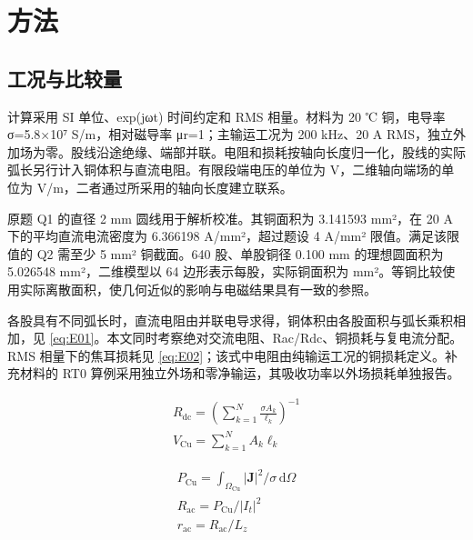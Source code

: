\section{方法}
\label{chapter:02}

\hypertarget{02.conventions.heading}{}
\subsection{工况与比较量}

\hypertarget{02.conventions.p1}{}
计算采用 SI 单位、exp(jωt) 时间约定和 RMS 相量。材料为 20 ℃ 铜，电导率 σ=5.8×10⁷ S/m，相对磁导率 μr=1；主输运工况为 200 kHz、20 A RMS，独立外加场为零。股线沿途绝缘、端部并联。电阻和损耗按轴向长度归一化，股线的实际弧长另行计入铜体积与直流电阻。有限段端电压的单位为 V，二维轴向端场的单位为 V/m，二者通过所采用的轴向长度建立联系。

\hypertarget{02.conventions.p2}{}
原题 Q1 的直径 2 mm 圆线用于解析校准。其铜面积为 3.141593 mm²，在 20 A 下的平均直流电流密度为 6.366198 A/mm²，超过题设 4 A/mm² 限值。满足该限值的 Q2 需至少 5 mm² 铜截面。640 股、单股铜径 0.100 mm 的理想圆面积为 5.026548 mm²，二维模型以 64 边形表示每股，实际铜面积为  mm²。等铜比较使用实际离散面积，使几何近似的影响与电磁结果具有一致的参照。

\hypertarget{02.conventions.p3}{}
各股具有不同弧长时，直流电阻由并联电导求得，铜体积由各股面积与弧长乘积相加，见 \eqref{eq:E01}。本文同时考察绝对交流电阻、Rac/Rdc、铜损耗与复电流分配。RMS 相量下的焦耳损耗见 \eqref{eq:E02}；该式中电阻由纯输运工况的铜损耗定义。补充材料的 RT0 算例采用独立外场和零净输运，其吸收功率以外场损耗单独报告。

\hypertarget{02.equation.E01}{}
\hypertarget{E01}{}
\begin{equation}
\begin{gathered}
R_{\mathrm{dc}}=\left(\sum_{k=1}^{N}\frac{\sigma A_k}{\ell_k}\right)^{-1} \\
V_{\mathrm{Cu}}=\sum_{k=1}^{N}A_k\ell_k
\end{gathered}
\tag{1}\label{eq:E01}
\end{equation}

\hypertarget{02.equation.E02}{}
\hypertarget{E02}{}
\begin{equation}
\begin{gathered}
P_{\mathrm{Cu}}=\int_{\Omega_{\mathrm{Cu}}}|\mathbf J|^2/\sigma\,\mathrm d\Omega \\
R_{\mathrm{ac}}=P_{\mathrm{Cu}}/|I_t|^2 \\
r_{\mathrm{ac}}=R_{\mathrm{ac}}/L_z
\end{gathered}
\tag{2}\label{eq:E02}
\end{equation}

